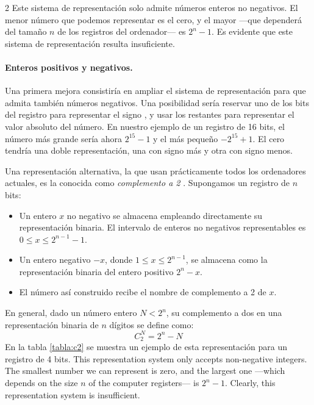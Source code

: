 \begin{paracol}{2}
Este sistema de representación solo admite números enteros no negativos. El menor número que podemos representar es el cero, y el mayor ---que dependerá del tamaño $n$ de los registros del ordenador--- es $2^n-1$. Es evidente que este sistema de representación resulta insuficiente.

\paragraph{Enteros positivos y negativos.}
Una primera mejora consistiría en ampliar el sistema de representación para que admita también números negativos. Una posibilidad sería reservar uno de los bits del registro para representar el signo , y usar los restantes para representar el valor absoluto del número. En nuestro ejemplo de un registro de 16 bits, el número más grande sería ahora $2^{15}-1$ y el más pequeño $-2^{15}+1$. El cero tendría una doble representación, una con signo más y otra con signo menos.

Una representación alternativa, la que usan prácticamente todos los ordenadores actuales, es la conocida como \emph{complemento a 2}  . Supongamos un registro de $n$ bits:
\begin{itemize}
\item Un entero $x$ no negativo se almacena empleando directamente su representación binaria. El intervalo de enteros no negativos representables es $0 \le x \le 2^{n-1}-1$.
\item Un entero negativo $-x$, donde $1 \le x \le 2^{n-1}$, se almacena como la representación binaria del entero positivo $2^{n}-x$.
\item El número así construido recibe el nombre de complemento a 2 de $x$.
\end{itemize}
En general, dado un número entero $N<2^n$, su complemento a dos en una representación binaria de $n$ dígitos se define como:
\begin{equation*}
C_2^N=2^n-N
\end{equation*}
En la tabla \ref{tabla:c2} se muestra un ejemplo de esta representación para un registro de 4 bits.
\switchcolumn
This representation system only accepts non-negative integers. The smallest number we can represent is zero, and the largest one ---which depends on the size $n$ of the computer registers--- is $2^n-1$. Clearly, this representation system is insufficient.


\end{paracol}
